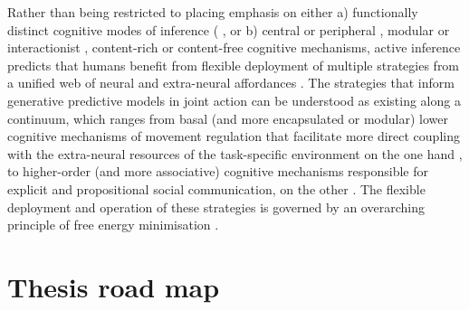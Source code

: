 \begin{CJK}{UTF8}{gbsn}
Rather than being restricted to placing emphasis on either a) functionally distinct cognitive modes of inference ( \citep[e.g., habitual or mental, explicit or implicit, slow or fast; ][]{Dienes1999,Kahneman2011}, or b) central or peripheral \citep[see][]{Fodor1985}, modular or interactionist \citep{Barrett2006}, content-rich or content-free \citep{OBrien2004,Ingold2001} cognitive mechanisms, active inference predicts that humans benefit from flexible deployment of multiple strategies from a unified web of neural and extra-neural affordances \citep{Pezzulo2013,Clark2015}.  The strategies that inform generative predictive models in joint action can be understood as existing along a continuum, which ranges from basal (and more encapsulated or modular) lower cognitive mechanisms of movement regulation that facilitate more direct coupling with the extra-neural resources of the task-specific environment on the one hand \citep[see][]{Riley2011}, to higher-order (and more associative) cognitive mechanisms responsible for explicit and propositional social communication, on the other \citep[see][]{Semin2012,Annilla2016}.  The flexible deployment and operation of these strategies is governed by an overarching principle of free energy minimisation \citep[the ``Free Energy Principle''][]{Friston2006}.









\section{Thesis road map}



\end{CJK}

